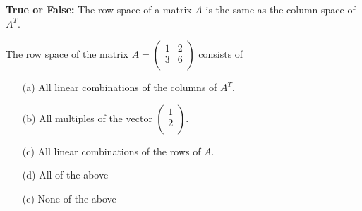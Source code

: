 \begin{problem}
    \textbf{True or False:} The row space of a matrix $A$ is the same as the column space of $A^T$.
\end{problem}

%             


\begin{problem}
    The row space of the matrix
$A=\left( \begin{array}{cc} 1 & 2\\ 3 & 6 \\ \end{array} \right)$ consists of
\begin{enumerate}
    \item[(a)] All linear combinations of the columns of $A^T$.
\item[(b)] All multiples of the vector $\left( \begin{array}{c} 1\\ 2\\ \end{array} \right)$. 
\item[(c)] All linear combinations of the rows of $A$.
\item[(d)] All of the above
\item[(e)] None of the above
\end{enumerate}
\end{problem}
% 
%             

